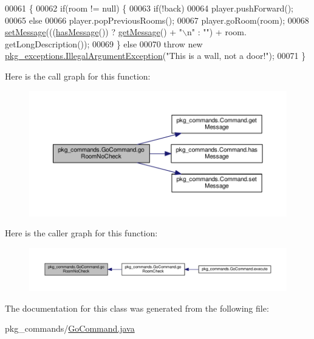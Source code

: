 \begin{DoxyCode}
00061                                                                                                            
                   \{
00062         \textcolor{keywordflow}{if}(room != null) \{
00063             \textcolor{keywordflow}{if}(!back)
00064                 player.pushForward();
00065             \textcolor{keywordflow}{else}
00066                 player.popPreviousRooms();
00067             player.goRoom(room);
00068             \hyperlink{classpkg__commands_1_1Command_ae210ff216fe908b111ba1c988a963d13}{setMessage}(((\hyperlink{classpkg__commands_1_1Command_ae46bb048d0fa705a5037a5204b530da2}{hasMessage}()) ? \hyperlink{classpkg__commands_1_1Command_ac2a42e2bab264821892daefaf9a18b6c}{getMessage}() + \textcolor{stringliteral}{"\(\backslash\)n"} : \textcolor{stringliteral}{""}) + room.
      getLongDescription());
00069         \} \textcolor{keywordflow}{else}
00070             \textcolor{keywordflow}{throw} \textcolor{keyword}{new} \hyperlink{classpkg__exceptions_1_1IllegalArgumentException}{pkg\_exceptions.IllegalArgumentException}(\textcolor{stringliteral}{"This
       is a wall, not a door!"});
00071     \}
\end{DoxyCode}


Here is the call graph for this function\-:
\nopagebreak
\begin{figure}[H]
\begin{center}
\leavevmode
\includegraphics[width=350pt]{classpkg__commands_1_1GoCommand_a210afbc5f3ef34d3ad5759d853c8f8c2_cgraph}
\end{center}
\end{figure}




Here is the caller graph for this function\-:
\nopagebreak
\begin{figure}[H]
\begin{center}
\leavevmode
\includegraphics[width=350pt]{classpkg__commands_1_1GoCommand_a210afbc5f3ef34d3ad5759d853c8f8c2_icgraph}
\end{center}
\end{figure}




The documentation for this class was generated from the following file\-:\begin{DoxyCompactItemize}
\item 
pkg\-\_\-commands/\hyperlink{GoCommand_8java}{Go\-Command.\-java}\end{DoxyCompactItemize}
